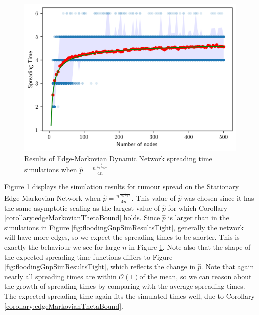 
\begin{figure}[h]
	\centering
	\includegraphics[width=1\textwidth]{./figures/flooding_simulation_first_term_max_p_over_4_with_errors.png}
	\caption{Results of Edge-Markovian Dynamic Network spreading time simulations when $\hat{p} = \frac{n^\frac{1}{\log \log n}}{4n}$}
	\label{fig:floodingSimFirstTermMaxPOver4}
\end{figure}

Figure \ref{fig:floodingSimFirstTermMaxPOver4} displays the simulation results for rumour spread on the Stationary Edge-Markovian Network when $\hat{p} = \frac{n^\frac{1}{\log \log n}}{4n}$. This value of $\hat{p}$ was chosen since it has the same asymptotic scaling as the largest value of $\hat{p}$ for which Corollary \ref{corollary:edgeMarkovianThetaBound} holds. Since $\hat{p}$ is larger than in the simulations in Figure \ref{fig:floodingGnpSimResultsTight}, generally the network will have more edges, so we expect the spreading times to be shorter. This is exactly the behaviour we see for large $n$ in Figure \ref{fig:floodingSimFirstTermMaxPOver4}. Note also that the shape of the expected spreading time functions differs to Figure \ref{fig:floodingGnpSimResultsTight}, which reflects the change in $\hat{p}$. Note that again nearly all spreading times are within $\mathcal{O}(1)$of the mean, so we can reason about the growth of spreading times by comparing with the average spreading times. The expected spreading time again fits the simulated times well, due to Corollary \ref{corollary:edgeMarkovianThetaBound}.

